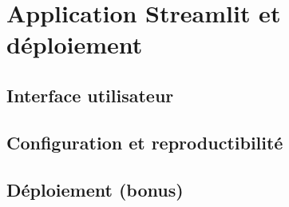 \chapter{Application Streamlit et déploiement}


\section{Interface utilisateur}


\section{Configuration et reproductibilité}

\section{Déploiement (bonus)}
